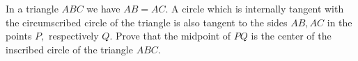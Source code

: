 In a triangle $ABC$ we have $AB = AC.$ A circle which is internally tangent with the circumscribed circle of the triangle is also tangent to the sides $AB, AC$ in the points $P,$ respectively $Q.$ Prove that the midpoint of $PQ$ is the center of the inscribed circle of the triangle $ABC.$